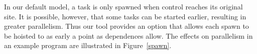 In our default model, a task is only spawned when control reaches its original site.
It is possible, however, that some tasks can be started earlier, resulting in greater parallelism.
Thus our tool provides an option that allows each spawn to be hoisted to as early a point as dependences allow.
The effects on parallelism in an example program are illustrated in Figure~\ref{spawn}.

